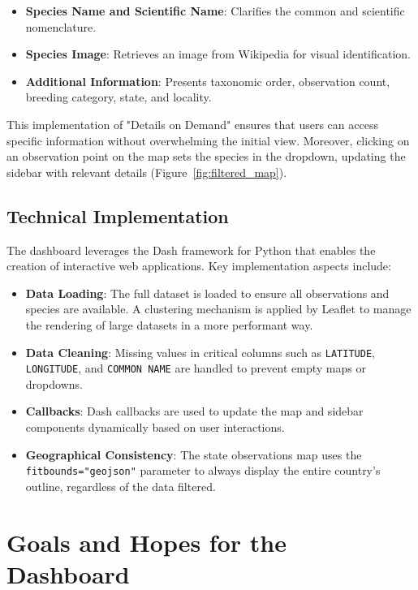 \begin{itemize}
    \item \textbf{Species Name and Scientific Name}: Clarifies the common and scientific nomenclature. 
    \item \textbf{Species Image}: Retrieves an image from Wikipedia for visual identification. 
    \item \textbf{Additional Information}: Presents taxonomic order, observation count, breeding category, state, and locality. 
\end{itemize}

This implementation of "Details on Demand" ensures that users can access specific information without overwhelming the initial view. Moreover, clicking on an observation point on the map sets the species in the dropdown, updating the sidebar with relevant details (Figure~\ref{fig:filtered_map}).

\subsection{Technical Implementation}

The dashboard leverages the Dash framework for Python \cite{DashDocumentationUser} that enables the creation of interactive web applications. Key implementation aspects include:

\begin{itemize} 
    \item \textbf{Data Loading}: The full dataset is loaded to ensure all observations and species are available. A clustering mechanism is applied by Leaflet to manage the rendering of large datasets in a more performant way.
    \item \textbf{Data Cleaning}: Missing values in critical columns such as \texttt{LATITUDE}, \texttt{LONGITUDE}, and \texttt{COMMON NAME} are handled to prevent empty maps or dropdowns. 
    \item \textbf{Callbacks}: Dash callbacks are used to update the map and sidebar components dynamically based on user interactions. 
    \item \textbf{Geographical Consistency}: The state observations map uses the \texttt{fitbounds="geojson"} parameter to always display the entire country's outline, regardless of the data filtered. 
\end{itemize}

\section{Goals and Hopes for the Dashboard}

